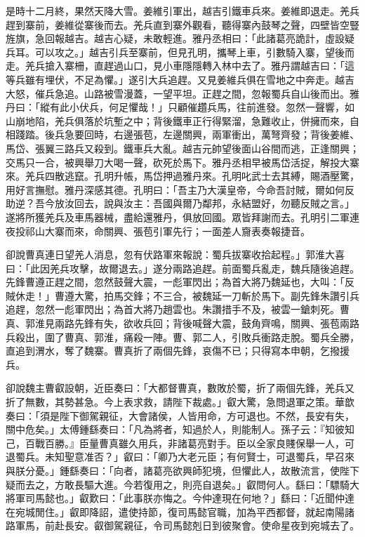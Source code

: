 是時十二月終，果然天降大雪。姜維引軍出，越吉引鐵車兵來。姜維即退走。羌兵趕到寨前，姜維從寨後而去。羌兵直到寨外觀看，聽得寨內鼓琴之聲，四壁皆空豎旌旗，急回報越吉。越吉心疑，未敢輕進。雅丹丞相曰：「此諸葛亮詭計，虛設疑兵耳。可以攻之。」越吉引兵至寨前，但見孔明，攜琴上車，引數騎入寨，望後而走。羌兵搶入寨柵，直趕過山口，見小車隱隱轉入林中去了。雅丹謂越吉曰：「這等兵雖有埋伏，不足為懼。」遂引大兵追趕。又見姜維兵俱在雪地之中奔走。越吉大怒，催兵急追。山路被雪漫蓋，一望平坦。正趕之間，忽報蜀兵自山後而出。雅丹曰：「縱有此小伏兵，何足懼哉！」只顧催趲兵馬，往前進發。忽然一聲響，如山崩地陷，羌兵俱落於坑塹之中；背後鐵車正行得緊溜，急難收止，併擁而來，自相踐踏。後兵急要回時，右邊張苞，左邊關興，兩軍衝出，萬弩齊發；背後姜維、馬岱、張翼三路兵又殺到。鐵車兵大亂。越吉元帥望後面山谷間而逃，正逢關興；交馬只一合，被興舉刀大喝一聲，砍死於馬下。雅丹丞相早被馬岱活捉，解投大寨來。羌兵四散逃竄。孔明升帳，馬岱押過雅丹來。孔明叱武士去其縛，賜酒壓驚，用好言撫慰。雅丹深感其德。孔明曰：「吾主乃大漢皇帝，今命吾討賊，爾如何反助逆？吾今放汝回去，說與汝主：吾國與爾乃鄰邦，永結盟好，勿聽反賊之言。」遂將所獲羌兵及車馬器械，盡給還雅丹，俱放回國。眾皆拜謝而去。孔明引二軍連夜投祁山大寨而來，命關興、張苞引軍先行；一面差人齎表奏報捷音。

卻說曹真連日望羌人消息，忽有伏路軍來報說：蜀兵拔寨收拾起程。」郭淮大喜曰：「此因羌兵攻擊，故爾退去。」遂分兩路追趕。前面蜀兵亂走，魏兵隨後追趕。先鋒曹遵正趕之間，忽然鼓聲大震，一彪軍閃出；為首大將乃魏延也，大叫：「反賊休走！」曹遵大驚，拍馬交鋒；不三合，被魏延一刀斬於馬下。副先鋒朱讚引兵追趕，忽然一彪軍閃出；為首大將乃趙雲也。朱讚措手不及，被雲一鎗刺死。曹真、郭淮見兩路先鋒有失，欲收兵回；背後喊聲大震，鼓角齊鳴，關興、張苞兩路兵殺出，圍了曹真、郭淮，痛殺一陣。曹、郭二人，引敗兵衝路走脫。蜀兵全勝，直追到渭水，奪了魏寨。曹真折了兩個先鋒，哀傷不已；只得寫本申朝，乞撥援兵。

卻說魏主曹叡設朝，近臣奏曰：「大都督曹真，數敗於蜀，折了兩個先鋒，羌兵又折了無數，其勢甚急。今上表求救，請陛下裁處。」叡大驚，急問退軍之策。華歆奏曰：「須是陛下御駕親征，大會諸侯，人皆用命，方可退也。不然，長安有失，關中危矣。」太傅鍾繇奏曰：「凡為將者，知過於人，則能制人。孫子云：『知彼知己，百戰百勝。』臣量曹真雖久用兵，非諸葛亮對手。臣以全家良賤保舉一人，可退蜀兵。未知聖意准否？」叡曰：「卿乃大老元臣；有何賢士，可退蜀兵，早召來與朕分憂。」鍾繇奏曰：「向者，諸葛亮欲興師犯境，但懼此人，故散流言，使陛下疑而去之，方敢長驅大進。今若復用之，則亮自退矣。」叡問何人。繇曰：「驃騎大將軍司馬懿也。」叡歎曰：「此事朕亦悔之。今仲達現在何地？」繇曰：「近聞仲達在宛城閒住。」叡即降詔，遣使持節，復司馬懿官職，加為平西都督，就起南陽諸路軍馬，前赴長安。叡御駕親征，令司馬懿剋日到彼聚會。使命星夜到宛城去了。

